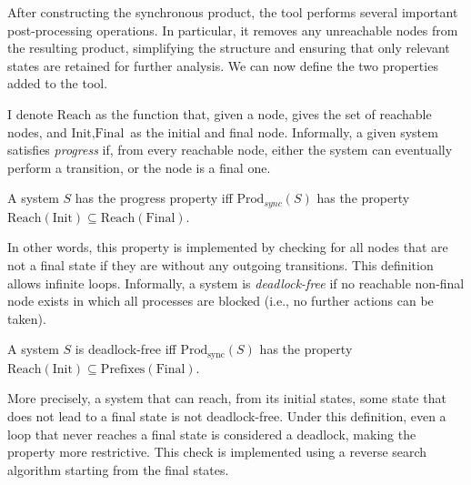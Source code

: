 After constructing the synchronous product, the tool performs several
important post-processing operations. In particular, it removes any
unreachable nodes from the resulting product, simplifying the structure
and ensuring that only relevant states are retained for further analysis.
We can now define the two properties added to the tool.

I denote $\text{Reach}$ as the function that, given a node, gives the set of 
reachable nodes, and $\text{Init}, \text{Final}$ as the initial and final node.
Informally, a given system satisfies \emph{progress} if, 
from every reachable node,
either the system can eventually perform a transition, or the node is
a final one.
\begin{definition}[Progress]
	A system $S$ has the progress property iff $\text{Prod}_{sync}(S)$
	has the property
	$\text{Reach}(\text{Init})\subseteq \text{Reach}(\text{Final})$.
\end{definition}


In other words, this property is implemented by checking for all nodes 
that are not a final state
if they are without any outgoing transitions. 
This definition allows infinite loops.
Informally, a system is \emph{deadlock-free} if no reachable
non-final node exists in which all processes are blocked (i.e., no further
actions can be taken).

\begin{definition}
	A system $S$ is deadlock-free iff
    $\text{Prod}_{\text{sync}}(S)$ has the property
	$\text{Reach}(\text{Init})\subseteq \text{Prefixes}(\text{Final})$.
\end{definition}


More precisely, a system that can reach, from its initial states, some state
that does not lead to a final state is not deadlock-free. Under this definition,
even a loop that never reaches a final state is considered a deadlock,
making the property more restrictive. This check is implemented using a
reverse search algorithm starting from the final states.

